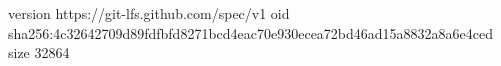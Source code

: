 version https://git-lfs.github.com/spec/v1
oid sha256:4c32642709d89fdfbfd8271bcd4eac70e930ecea72bd46ad15a8832a8a6e4ced
size 32864
